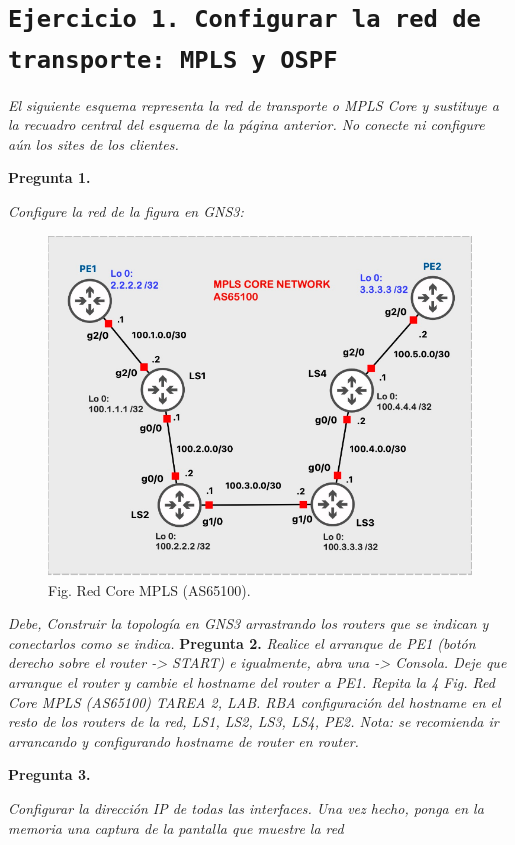 \documentclass[a4paper, 12pt]{report}
\begin{document}
\section{\texttt{Ejercicio 1. Configurar la red de transporte: MPLS y OSPF}}

\textit{El siguiente esquema representa la red de transporte o MPLS Core y sustituye a la recuadro
central del esquema de la página anterior. No conecte ni configure aún los sites de los clientes.}

\textbf{Pregunta 1.}

\textit{Configure la red de la figura en GNS3:}

\begin{figure}[H]
	\centering
	\includegraphics[scale=0.5]{maquetainicial.png}
	\caption{Fig. Red Core MPLS (AS65100).}
	\label{fig:maquetainicial}
\end{figure}

\textit{Debe, Construir la topología en GNS3 arrastrando los routers que se indican y conectarlos como se indica.}
\newpage
\textbf{Pregunta 2.}
\textit{Realice el arranque de PE1 (botón derecho sobre el router -> START) e igualmente, abra una
-> Consola. Deje que arranque el router y cambie el hostname del router a PE1. Repita la
4
Fig. Red Core MPLS (AS65100)
TAREA 2, LAB. RBA
configuración del hostname en el resto de los routers de la red, LS1, LS2, LS3, LS4, PE2.
Nota: se recomienda ir arrancando y configurando hostname de router en router.}

\textbf{Pregunta 3.}

\textit{Configurar la dirección IP de todas las interfaces. Una vez hecho, ponga en la memoria una
captura de la pantalla que muestre la red}
\end{document}
